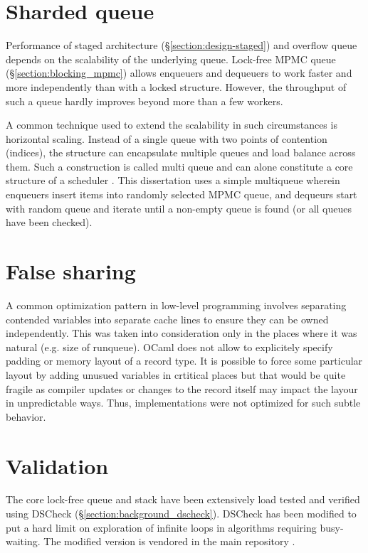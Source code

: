 \documentclass[12pt,a4paper,twoside]{report}
\begin{document}
\section{Sharded queue}
\label{section:multiqueue_details}

Performance of staged architecture (\S\ref{section:design-staged}) and overflow queue depends on the scalability of the underlying queue. Lock-free MPMC queue (\S\ref{section:blocking_mpmc}) allows enqueuers and dequeuers to work faster and more independently than with a locked structure. However, the throughput of such a queue hardly improves beyond more than a few workers.  

A common technique used to extend the scalability in such circumstances is horizontal scaling. Instead of a single queue with two points of contention (indices), the structure can encapsulate multiple queues and load balance across them. Such a construction is called multi queue and can alone constitute a core structure of a scheduler \cite{Postnikova2022}. This dissertation uses a simple multiqueue wherein enqueuers insert items into randomly selected MPMC queue, and dequeurs start with random queue and iterate until a non-empty queue is found (or all queues have been checked).

\section{False sharing}
A common optimization pattern in low-level programming involves separating contended variables into separate cache lines to ensure they can be owned independently. This was taken into consideration only in the places where it was natural (e.g. size of runqueue). OCaml does not allow to explicitely specify padding or memory layout of a record type. It is possible to force some particular layout by adding unusued variables in crtitical places but that would be quite fragile as compiler updates or changes to the record itself may impact the layour in unpredictable ways. Thus, implementations were not optimized for such subtle behavior. 

\section{Validation}

The core lock-free queue and stack have been extensively load tested and verified using DSCheck (\S\ref{section:background_dscheck}). DSCheck has been modified to put a hard limit on exploration of infinite loops in algorithms requiring busy-waiting. The modified version is vendored in the main repository \cite{bartoszm90:online}.
\end{document}
